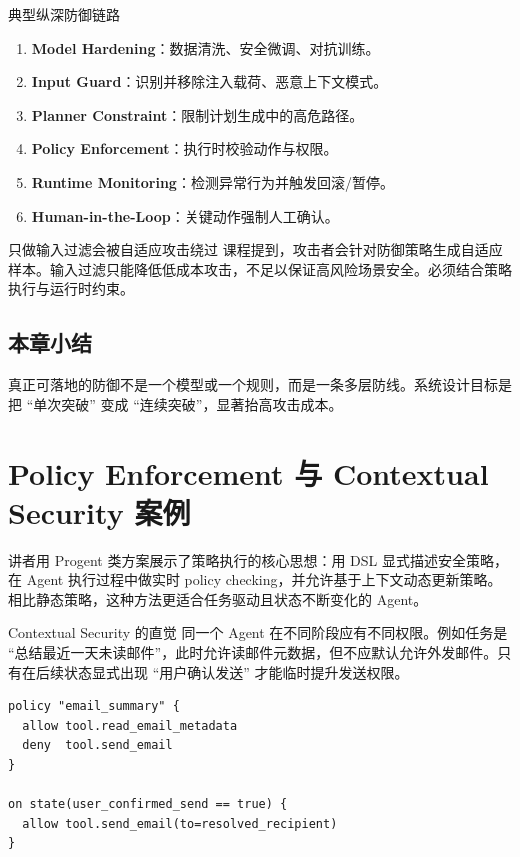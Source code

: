 \documentclass[a4paper]{article}
\begin{document}
\begin{knowledgebox}{典型纵深防御链路}
\begin{enumerate}
    \item \textbf{Model Hardening}：数据清洗、安全微调、对抗训练。
    \item \textbf{Input Guard}：识别并移除注入载荷、恶意上下文模式。
    \item \textbf{Planner Constraint}：限制计划生成中的高危路径。
    \item \textbf{Policy Enforcement}：执行时校验动作与权限。
    \item \textbf{Runtime Monitoring}：检测异常行为并触发回滚/暂停。
    \item \textbf{Human-in-the-Loop}：关键动作强制人工确认。
\end{enumerate}
\end{knowledgebox}

\begin{warningbox}{只做输入过滤会被自适应攻击绕过}
课程提到，攻击者会针对防御策略生成自适应样本。输入过滤只能降低低成本攻击，不足以保证高风险场景安全。必须结合策略执行与运行时约束。
\end{warningbox}

\subsection{本章小结}
真正可落地的防御不是一个模型或一个规则，而是一条多层防线。系统设计目标是把 ``单次突破'' 变成 ``连续突破''，显著抬高攻击成本。

\section{Policy Enforcement 与 Contextual Security 案例}

讲者用 Progent 类方案展示了策略执行的核心思想：用 DSL 显式描述安全策略，在 Agent 执行过程中做实时 policy checking，并允许基于上下文动态更新策略。相比静态策略，这种方法更适合任务驱动且状态不断变化的 Agent。

\begin{knowledgebox}{Contextual Security 的直觉}
同一个 Agent 在不同阶段应有不同权限。例如任务是 ``总结最近一天未读邮件''，此时允许读邮件元数据，但不应默认允许外发邮件。只有在后续状态显式出现 ``用户确认发送'' 才能临时提升发送权限。
\end{knowledgebox}

\begin{lstlisting}[caption={策略示意：基于上下文限制高风险动作}]
policy "email_summary" {
  allow tool.read_email_metadata
  deny  tool.send_email
}

on state(user_confirmed_send == true) {
  allow tool.send_email(to=resolved_recipient)
}
\end{lstlisting}
\end{document}
